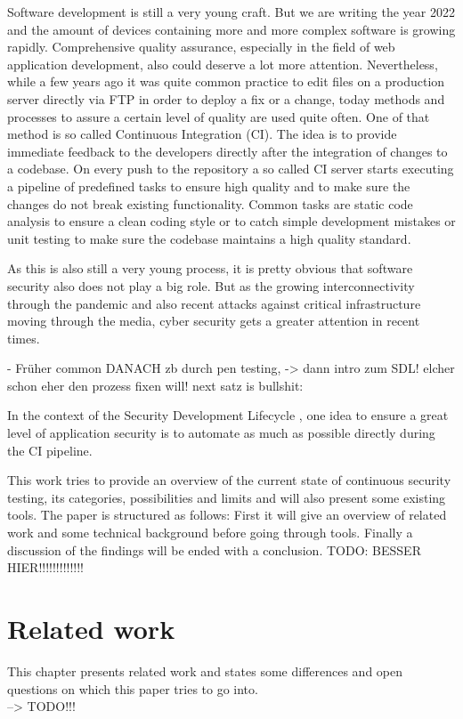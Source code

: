 \documentclass[conference]{IEEEtran}
\begin{document}
Software development is still a very young craft. But we are writing the year 2022 and the amount of devices containing more and more complex software is growing rapidly. Comprehensive quality assurance, especially in the field of web application development, also could deserve a lot more attention. Nevertheless, while a few years ago it was quite common practice to edit files on a production server directly via FTP in order to deploy a fix or a change, today methods and processes to assure a certain level of quality are used quite often. One of that method is so called Continuous Integration (CI). The idea is to provide immediate feedback to the developers directly after the integration of changes to a codebase. On every push to the repository a so called CI server starts executing a pipeline of predefined tasks to ensure high quality and to make sure the changes do not break existing functionality. Common tasks are static code analysis to ensure a clean coding style or to catch simple development mistakes or unit testing to make sure the codebase maintains a high quality standard.

As this is also still a very young process, it is pretty obvious that software security also does not play a big role. But as the growing interconnectivity through the pandemic and also recent attacks against critical infrastructure moving through the media, cyber security gets a greater attention in recent times.

- Früher common DANACH zb durch pen testing, -> dann intro zum SDL! elcher schon eher den prozess fixen will!
next satz is bullshit:

In the context of the Security Development Lifecycle \cite{sdl}, one idea to ensure a great level of application security is to automate as much as possible directly during the CI pipeline. 

This work tries to provide an overview of the current state of continuous security testing, its categories, possibilities and limits and will also present some existing tools. The paper is structured as follows: First it will give an overview of related work and some technical background before going through tools. Finally a discussion of the findings will be ended with a conclusion. TODO: BESSER HIER!!!!!!!!!!!!!

\section{Related work}

This chapter presents related work and states some differences and open questions on which this paper tries to go into.\\ --> TODO!!!
\end{document}
